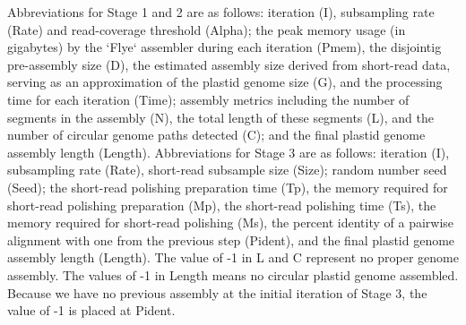 \begingroup
\scriptsize
\setlength{\parskip}{2pt}

Abbreviations for Stage 1 and 2 are as follows: 
iteration (I), subsampling rate (Rate) and read-coverage threshold (Alpha);
the peak memory usage (in gigabytes) by the `Flye` assembler during each iteration (Pmem),
the disjointig pre-assembly size (D),
the estimated assembly size derived from short-read data, serving as an approximation of the plastid genome size (G), and
the processing time for each iteration (Time);
assembly metrics including the number of segments in the assembly (N),
the total length of these segments (L), and
the number of circular genome paths detected (C); and
the final plastid genome assembly length (Length).
Abbreviations for Stage 3 are as follows: 
iteration (I), subsampling rate (Rate), short-read subsample size (Size);
random number seed (Seed);
the short-read polishing preparation time (Tp),
the memory required for short-read polishing preparation (Mp),
the short-read polishing time (Ts),
the memory required for short-read polishing (Ms),
the percent identity of a pairwise alignment with one from the previous step (Pident), and
the final plastid genome assembly length (Length).
The value of -1 in L and C represent no proper genome assembly.
The values of -1 in Length means no circular plastid genome assembled.
Because we have no previous assembly at the initial iteration of Stage 3,
the value of -1 is placed at Pident.

\endgroup

